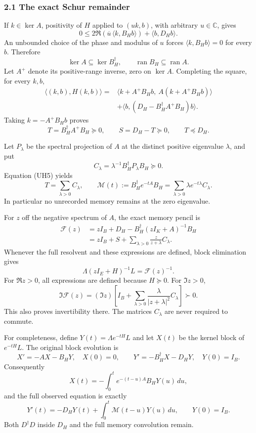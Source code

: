 \documentclass[11pt]{article}
\begin{document}
\subsubsection{2.1 The exact Schur remainder}\label{the-exact-schur-remainder}

If \(k\in\ker A\), positivity of \(H\) applied to \((uk,b)\), with arbitrary \(u\in\mathbb C\), gives \[
 0\le 2\Re(\overline u\,\langle k,B_Hb\rangle)+\langle b,D_Hb\rangle.
\] An unbounded choice of the phase and modulus of \(u\) forces \(\langle k,B_Hb\rangle=0\) for every \(b\). Therefore \[
 \ker A\subseteq\ker B_H^\dagger,\qquad
 \operatorname{ran}B_H\subseteq\operatorname{ran}A.
 \tag{UH5}
\] Let \(A^+\) denote its positive-range inverse, zero on \(\ker A\). Completing the square, for every \(k,b\), \[
\begin{aligned}
 \langle(k,b),H(k,b)\rangle
 ={}&\langle k+A^+B_Hb,\ A(k+A^+B_Hb)\rangle\\
 &+\langle b,(D_H-B_H^\dagger A^+B_H)b\rangle.
\end{aligned}
\] Taking \(k=-A^+B_Hb\) proves \[
 T=B_H^\dagger A^+B_H\succeq0,\qquad
 S=D_H-T\succeq0,\qquad T\preceq D_H.
 \tag{UH6}
\]

Let \(P_\lambda\) be the spectral projection of \(A\) at the distinct positive eigenvalue \(\lambda\), and put \[
 C_\lambda=\lambda^{-1}B_H^\dagger P_\lambda B_H\succeq0.
\] Equation (UH5) yields \[
 T=\sum_{\lambda>0}C_\lambda,\qquad
 \mathcal M(t):=B_H^\dagger e^{-tA}B_H
 =\sum_{\lambda>0}\lambda e^{-t\lambda}C_\lambda.
 \tag{UH7}
\] In particular no unrecorded memory remains at the zero eigenvalue.

For \(z\) off the negative spectrum of \(A\), the exact memory pencil is \[
\begin{aligned}
 \mathcal F(z)
 &=zI_B+D_H-B_H^\dagger(zI_K+A)^{-1}B_H\\
 &=zI_B+S+\sum_{\lambda>0}\frac{z}{z+\lambda}C_\lambda.
\end{aligned}
 \tag{UH8}
\] Whenever the full resolvent and these expressions are defined, block elimination gives \[
 \Lambda(zI_E+H)^{-1}L=\mathcal F(z)^{-1}.
 \tag{UH9}
\] For \(\Re z>0\), all expressions are defined because \(H\succeq0\). For \(\Im z>0\), \[
 \Im\mathcal F(z)
 =(\Im z)\left[I_B+\sum_{\lambda>0}
       \frac{\lambda}{|z+\lambda|^2}C_\lambda\right]\succ0.
 \tag{UH10}
\] This also proves invertibility there. The matrices \(C_\lambda\) are never required to commute.

For completeness, define \(Y(t)=\Lambda e^{-tH}L\) and let \(X(t)\) be the kernel block of \(e^{-tH}L\). The original block evolution is \[
 X'=-AX-B_HY,\quad X(0)=0,\qquad
 Y'=-B_H^\dagger X-D_HY,\quad Y(0)=I_B.
\] Consequently \[
 X(t)=-\int_0^t e^{-(t-u)A}B_HY(u)\,du,
\] and the full observed equation is exactly \[
 Y'(t)=-D_HY(t)+\int_0^t\mathcal M(t-u)Y(u)\,du,\qquad Y(0)=I_B.
 \tag{UH11}
\] Both \(D^\dagger D\) inside \(D_H\) and the full memory convolution remain.
\end{document}
